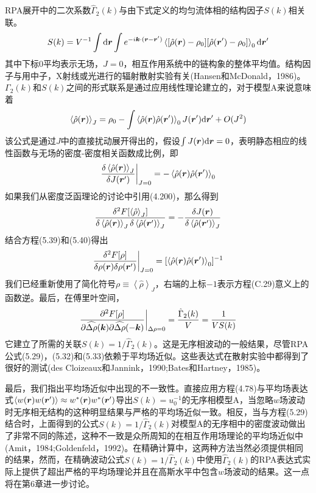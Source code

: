 RPA展开中的二次系数$\hat{\Gamma}_2(k)$与由下式定义的均匀流体相的结构因子$S(k)$相关联。
\begin{equation}
S(k)=V^{-1}\int\mathrm{d}\bm{r}\int e^{-i\bm{k}\cdot(\bm{r}-\bm{r}')}\left\langle[\hat{\rho}(\bm{r})-\rho_0][\hat{\rho}(\bm{r}')-\rho_0]\right\rangle_0\mathrm{d}\bm{r}'
\end{equation}
其中下标$0$平均表示无场，$J=0$，相互作用系统中的链构象的整体平均值。结构因子与用中子，X射线或光进行的辐射散射实验有关(Hansen和McDonald，1986)。$\Gamma_2(k)$和$S(k)$之间的形式联系是通过应用线性理论建立的，对于模型A来说意味着
\begin{equation}
\left\langle\hat{\rho}(\bm{r})\right\rangle_J=\rho_0-\int\left\langle\hat{\rho}(\bm{r})\hat{\rho}(\bm{r}')\right\rangle_0J(\bm{r}')\mathrm{d}\bm{r}'+O(J^2)
\end{equation}
该公式是通过$J$中的直接扰动展开得出的，假设$\int J(\bm{r})\mathrm{d}\bm{r}=0$，表明静态相应的线性函数与无场的密度-密度相关函数成比例，即
\begin{equation}
\frac{\delta\left\langle\hat{\rho}(\bm{r})\right\rangle_J}{\delta J(\bm{r}')}\bigg|_{J=0}=-\left\langle\hat{\rho}(\bm{r})\hat{\rho}(\bm{r}')\right\rangle_0
\end{equation}
如果我们从密度泛函理论的讨论中引用(4.200)，那么得到
\begin{equation}
\frac{\delta^2F[\left\langle\hat{\rho}\right\rangle_J]}{\delta\left\langle\hat{\rho}(\bm{r})\right\rangle_J\delta\left\langle\hat{\rho}(\bm{r}')\right\rangle_J}=-\frac{\delta J(\bm{r})}{\delta\left\langle\hat{\rho}(\bm{r}')\right\rangle_J}
\end{equation}
结合方程(5.39)和(5.40)得出
\begin{equation}
\frac{\delta^2F[\rho]}{\delta\rho(\bm{r})\delta\rho(\bm{r}')}\bigg|_{J=0}=[\left\langle\hat{\rho}(\bm{r})\hat{\rho}(\bm{r}')\right\rangle_0]^{-1}
\end{equation}
我们已经重新使用了简化符号$\rho\equiv\left\langle\hat{\rho}\right\rangle_J$，右端的上标$-1$表示方程(C.29)意义上的函数逆。最后，在傅里叶空间，
\begin{equation}
\frac{\partial^2F[\rho]}{\partial\widehat{\Delta\rho}(\bm{k})\partial\widehat{\Delta\rho}(-\bm{k})}\bigg|_{\Delta\rho=0}=\frac{\hat{\Gamma}_2(k)}{V}=\frac{1}{VS(k)}
\end{equation}
它建立了所需的关联$S(k)=1/\hat{\Gamma}_2(k)$。这是无序相波动的一般结果，尽管RPA公式(5.29)，(5.32)和(5.33)依赖于平均场近似。这些表达式在散射实验中都得到了很好的测试(des Cloizeaux和Jannink，1990;Bates和Hartney，1985)。

最后，我们指出平均场近似中出现的不一致性。直接应用方程(4.78)与平均场表达式$\left\langle w(\bm{r})w(\bm{r}')\right\rangle\approx w^*(\bm{r})w^*(\bm{r}')$导出$S(k)=u_0^{-1}$的无序相模型A，当忽略$w$场波动时无序相无结构的这种明显结果与严格的平均场近似一致。相反，当与方程(5.29)结合时，上面得到的公式$S(k)=1/\hat{\Gamma}_2(k)$对模型A的无序相中的密度波动做出了非常不同的陈述，这种不一致是众所周知的在相互作用场理论的平均场近似中(Amit，1984;Goldenfeld，1992)。在精确计算中，这两种方法当然必须提供相同的结果，然而，在精确波动公式$S(k)=1/\hat{\Gamma}_2(k)$中使用$\hat{\Gamma}_2(k)$的RPA表达式实际上提供了超出严格的平均场理论并且在高斯水平中包含$w$场波动的结果。这一点将在第6章进一步讨论。
